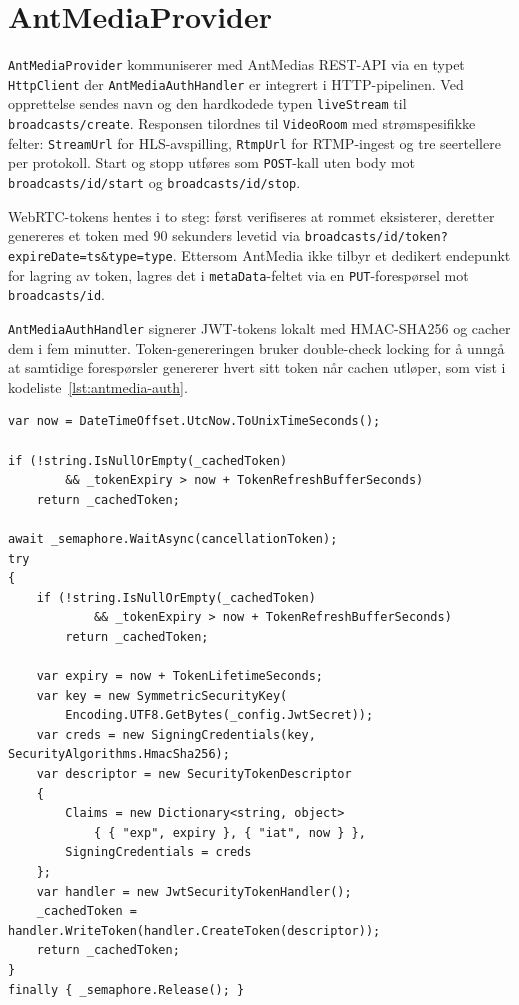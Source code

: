 \section{AntMediaProvider}
\label{sec:antmedia-provider}

\texttt{AntMediaProvider} kommuniserer med AntMedias REST-API via en typet \texttt{HttpClient} der \texttt{AntMediaAuthHandler} er integrert i HTTP-pipelinen. Ved opprettelse sendes navn og den hardkodede typen \texttt{liveStream} til \texttt{broadcasts/create}. Responsen tilordnes til \texttt{VideoRoom} med strømspesifikke felter: \texttt{StreamUrl} for HLS-avspilling, \texttt{RtmpUrl} for RTMP-ingest og tre seertellere per protokoll. Start og stopp utføres som \texttt{POST}-kall uten body mot \texttt{broadcasts/{id}/start} og \texttt{broadcasts/{id}/stop}.

WebRTC-tokens hentes i to steg: først verifiseres at rommet eksisterer, deretter genereres et token med 90 sekunders levetid via \texttt{broadcasts/{id}/token?expireDate={ts}&type={type}}. Ettersom AntMedia ikke tilbyr et dedikert endepunkt for lagring av token, lagres det i \texttt{metaData}-feltet via en \texttt{PUT}-forespørsel mot \texttt{broadcasts/{id}}.

\texttt{AntMediaAuthHandler} signerer JWT-tokens lokalt med HMAC-SHA256 og cacher dem i fem minutter. Token-genereringen bruker double-check locking for å unngå at samtidige forespørsler genererer hvert sitt token når cachen utløper, som vist i kodeliste~\ref{lst:antmedia-auth}.

\begin{lstlisting}[language={[Sharp]C}, label=lst:antmedia-auth,
  caption={Double-check locking i AntMediaAuthHandler.}]
var now = DateTimeOffset.UtcNow.ToUnixTimeSeconds();

if (!string.IsNullOrEmpty(_cachedToken)
        && _tokenExpiry > now + TokenRefreshBufferSeconds)
    return _cachedToken;

await _semaphore.WaitAsync(cancellationToken);
try
{
    if (!string.IsNullOrEmpty(_cachedToken)
            && _tokenExpiry > now + TokenRefreshBufferSeconds)
        return _cachedToken;

    var expiry = now + TokenLifetimeSeconds;
    var key = new SymmetricSecurityKey(
        Encoding.UTF8.GetBytes(_config.JwtSecret));
    var creds = new SigningCredentials(key, SecurityAlgorithms.HmacSha256);
    var descriptor = new SecurityTokenDescriptor
    {
        Claims = new Dictionary<string, object>
            { { "exp", expiry }, { "iat", now } },
        SigningCredentials = creds
    };
    var handler = new JwtSecurityTokenHandler();
    _cachedToken = handler.WriteToken(handler.CreateToken(descriptor));
    return _cachedToken;
}
finally { _semaphore.Release(); }
\end{lstlisting}

